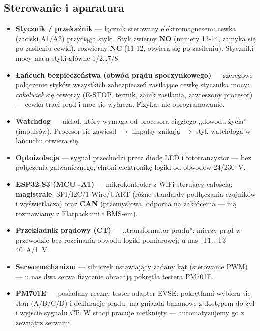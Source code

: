 \documentclass[11pt,a4paper]{article}
\newcommand{\poj}[2]{\item \textbf{#1} --- #2}
\begin{document}
\subsection{Sterowanie i aparatura}
\begin{itemize}
\poj{Stycznik / przekaźnik}{łącznik sterowany elektromagnesem: cewka (zaciski A1/A2) przyciąga
styki. Styk zwierny \textbf{NO} (numery 13-14, zamyka się po zasileniu cewki), rozwierny
\textbf{NC} (11-12, otwiera się po zasileniu). Styczniki mocy mają styki główne 1/2\ldots7/8.}
\poj{Łańcuch bezpieczeństwa (obwód prądu spoczynkowego)}{szeregowe połączenie styków wszystkich
zabezpieczeń zasilające cewkę stycznika mocy: \emph{cokolwiek} się otworzy (E-STOP, termik,
zanik zasilania, zawieszony procesor) --- cewka traci prąd i moc się wyłącza. Fizyka, nie
oprogramowanie.}
\poj{Watchdog}{układ, który wymaga od procesora ciągłego ,,dowodu życia'' (impulsów). Procesor
się zawiesił $\to$ impulsy znikają $\to$ styk watchdoga w łańcuchu otwiera się.}
\poj{Optoizolacja}{sygnał przechodzi przez diodę LED i fototranzystor --- bez połączenia
galwanicznego; chroni elektronikę logiki od obwodów 24/230~V.}
\poj{ESP32-S3 (MCU -A1)}{mikrokontroler z WiFi sterujący całością; \textbf{magistrale}:
SPI/I2C/1-Wire/UART (różne standardy podłączania czujników i wyświetlacza) oraz \textbf{CAN}
(przemysłowa, odporna na zakłócenia --- nią rozmawiamy z Flatpackami i BMS-em).}
\poj{Przekładnik prądowy (CT)}{,,transformator prądu'': mierzy prąd w przewodzie bez rozcinania
obwodu logiki pomiarowej; u nas -T1..-T3 40~A/1~V.}
\poj{Serwomechanizm}{silniczek ustawiający zadany kąt (sterowanie PWM) --- u nas dwa serwa
fizycznie obracają pokrętła testera PM701E.}
\poj{PM701E}{posiadany ręczny tester-adapter EVSE: pokrętłami wybiera się stan (A/B/C/D) i
deklarację prądu; ma gniazda bananowe z dostępem do żył i wyjście sygnału CP. W stacji pracuje
nietknięty --- automatyzujemy go z zewnątrz serwami.}
\end{itemize}
\end{document}
